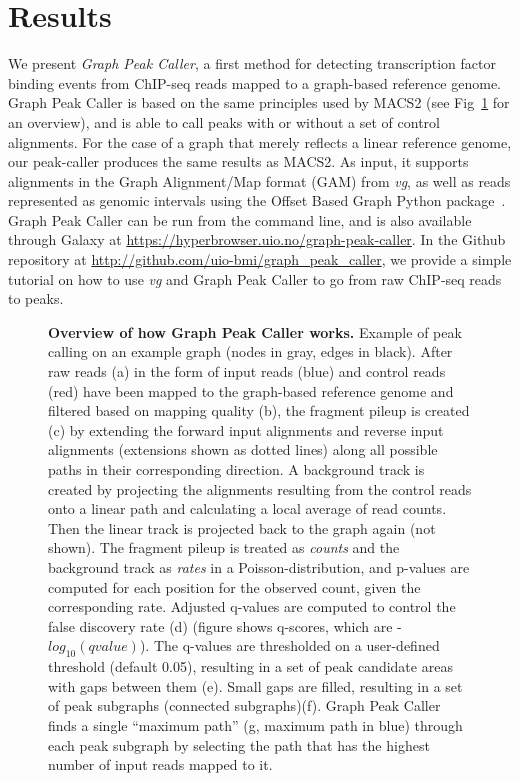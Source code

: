 \documentclass[10pt,letterpaper]{article}
\begin{document}
\section*{Results}
We present \emph{Graph Peak Caller}, a first method for detecting transcription factor binding events from ChIP-seq reads mapped to a graph-based reference genome. Graph Peak Caller is based on the same principles used by MACS2 (see Fig~\ref{overview_figure} for an overview), and  is able to call peaks with or without a set of control alignments. For the case of a graph that merely reflects a linear reference genome, our peak-caller produces the same results as MACS2. As input, it supports alignments in the Graph Alignment/Map format (GAM) from \emph{vg}, as well as reads represented as genomic intervals using the Offset Based Graph Python package~\cite{rand}. Graph Peak Caller can be run from the command line, and is also available through Galaxy at \url{https://hyperbrowser.uio.no/graph-peak-caller}.
In the Github repository at \url{http://github.com/uio-bmi/graph_peak_caller}, we provide a simple tutorial on how to use \emph{vg} and Graph Peak Caller to go from raw ChIP-seq reads to peaks. 
\begin{figure}
   \label{overview_figure}
   \caption{{\bf Overview of how Graph Peak Caller works.} Example of peak calling on an example graph (nodes in gray, edges in black). After raw reads (a) in the form of input reads (blue) and control reads (red) have been mapped to the graph-based reference genome and filtered based on mapping quality (b), the fragment pileup is created (c) by extending the forward input alignments and reverse input alignments (extensions shown as dotted lines) along all possible paths in their corresponding direction.
     A background track is created by projecting the alignments resulting from the control reads onto a linear path and calculating a local average of read counts.
     Then the linear track is projected back to the graph again (not shown).
     The fragment pileup is treated as \emph{counts} and the background track as \emph{rates} in a Poisson-distribution, and p-values are computed for each position for the observed count, given the corresponding rate.
     Adjusted q-values are computed to control the false discovery rate (d) (figure shows q-scores, which are -$log_{10}(qvalue)$). The q-values are thresholded on a user-defined threshold (default 0.05), resulting in a set of peak candidate areas with gaps between them (e). Small gaps are filled, resulting in a set of peak subgraphs (connected subgraphs)(f). Graph Peak Caller finds a single “maximum path” (g, maximum path in blue) through each peak subgraph by selecting the path that has the highest number of input reads mapped to it. }
\end{figure}
\end{document}
